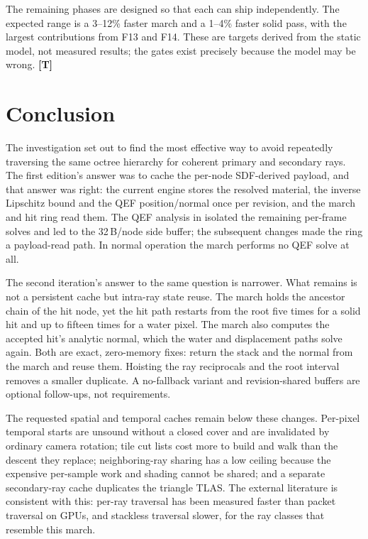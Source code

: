 \documentclass[11pt,a4paper]{article}
\newcommand{\evT}{\textsf{\textbf{\color{evT}[T]}}}
\DeclareRobustCommand{\fpath}[1]{\path{#1}}
\theoremstyle{plain}
\theoremstyle{definition}
\theoremstyle{remark}
\begin{document}
The remaining phases are designed so that each can ship independently. The
expected range is a 3--12\% faster march and a 1--4\% faster solid pass, with
the largest contributions from F13 and F14. These are targets derived from the
static model, not measured results; the gates exist precisely because the model
may be wrong. \evT

\section{Conclusion}

The investigation set out to find the most effective way to avoid repeatedly
traversing the same octree hierarchy for coherent primary and secondary rays.
The first edition's answer was to cache the per-node SDF-derived payload, and
that answer was right: the current engine stores the resolved material, the
inverse Lipschitz bound and the QEF position/normal once per revision, and the
march and hit ring read them. The QEF analysis in \fpath{qef_gpu.tex} isolated
the remaining per-frame solves and led to the 32\,B/node side buffer; the
subsequent changes made the ring a payload-read path. In normal operation the
march performs no QEF solve at all.

The second iteration's answer to the same question is narrower. What remains
is not a persistent cache but intra-ray state reuse. The march holds the
ancestor chain of the hit node, yet the hit path restarts from the root five
times for a solid hit and up to fifteen times for a water pixel. The march also
computes the accepted hit's analytic normal, which the water and displacement
paths solve again. Both are exact, zero-memory fixes: return the stack and the
normal from the march and reuse them. Hoisting the ray reciprocals and the root
interval removes a smaller duplicate. A no-fallback variant and revision-shared
buffers are optional follow-ups, not requirements.

The requested spatial and temporal caches remain below these changes.
Per-pixel temporal starts are unsound without a closed cover and are
invalidated by ordinary camera rotation; tile cut lists cost more to build and
walk than the descent they replace; neighboring-ray sharing has a low ceiling
because the expensive per-sample work and shading cannot be shared; and a
separate secondary-ray cache duplicates the triangle TLAS. The external
literature is consistent with this: per-ray traversal has been measured faster
than packet traversal on GPUs, and stackless traversal slower, for the ray
classes that resemble this march.
\end{document}
